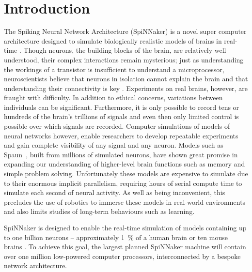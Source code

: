 \chapter{Introduction}

\label{sec:introduction}

%

The Spiking Neural Network Architecture (SpiNNaker) is a novel super computer
architecture designed to simulate biologically realistic models of brains in
real-time \cite{furber07}. Though neurons, the building blocks of the brain,
are relatively well understood, their complex interactions remain mysterious;
just as understanding the workings of a transistor is insufficient to
understand a microprocessor, neuroscientists believe that neurons in isolation
cannot explain the brain and that understanding their connectivity is key
\cite{eliasmith13,eliasmith14}. Experiments on real brains, however, are
fraught with difficulty. In addition to ethical concerns, variations between
individuals can be significant. Furthermore, it is only possible to record tens
or hundreds of the brain's trillions of signals and even then only limited
control is possible over which signals are recorded. Computer simulations of
models of neural networks however, enable researchers to develop repeatable
experiments and gain complete visibility of any signal and any neuron. Models
such as Spaun~\cite{eliasmith12}, built from millions of simulated neurons,
have shown great promise in expanding our understanding of higher-level brain
functions such as memory and simple problem solving. Unfortunately these models
are expensive to simulate due to their enormous implicit parallelism, requiring
hours of serial compute time to simulate each second of neural activity. As
well as being inconvenient, this precludes the use of robotics to immerse these
models in real-world environments and also limits studies of long-term
behaviours such as learning.

SpiNNaker is designed to enable the real-time simulation of models containing
up to one billion neurons -- approximately \SI{1}{\percent} of a human brain or
ten mouse brains \cite{furber06}. To achieve this goal, the largest planned
SpiNNaker machine will contain over one million low-powered computer
processors, interconnected by a bespoke network architecture.


